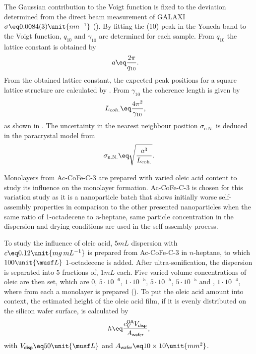 \documentclass[\main/dresen_thesis.tex]{subfiles}
\begin{document}
      The Gaussian contribution to the Voigt function is fixed to the deviation determined from the direct beam measurement of GALAXI $\sigma \eq 0.0084(3) \unit{nm^{-1}}$ ().
      By fitting the (10) peak in the Yoneda band to the Voigt function, $q_{10}$ and $\gamma_{10}$ are determined for each sample.
      From $q_{10}$ the lattice constant is obtained by
      \begin{align}
        a &\eq \frac{2 \pi}{q_{10}}.
      \end{align}
      From the obtained lattice constant, the expected peak positions for a square lattice structure are calculated by .
      From $\gamma_{10}$ the coherence length is given by
      \begin{align}
        L_{coh.} &\eq \frac{4 \pi^2}{\gamma_{10}},
      \end{align}
      as shown in .
      The uncertainty in the nearest neighbour position $\sigma_{\mathrm{n.N.}}$ is deduced in the paracrystal model from
      \begin{align}
        \sigma_{\mathrm{n.N.}} \eq \sqrt{\frac{a^3}{L_\mathrm{coh.}}}.
      \end{align}

      Monolayers from Ac-CoFe-C-3 are prepared with varied oleic acid content to study its influence on the monolayer formation.
      Ac-CoFe-C-3 is chosen for this variation study as it is a nanoparticle batch that shows initially worse self-assembly properties in comparison to the other presented nanoparticles when the same ratio of 1-octadecene to \textit{n}-heptane, same particle concentration in the dispersion and drying conditions are used in the self-assembly process.

      To study the influence of oleic acid, $5 \unit{mL}$ dispersion with $c \eq 0.12 \unit{mg \, mL^{-1}}$ is prepared from Ac-CoFe-C-3 in $\mathit{n}$-heptane, to which $100 \unit{\musf L}$ 1-octadecene is added.
      After ultra-sonification, the dispersion is separated into 5 fractions of, $1 \unit{mL}$ each.
      Five varied volume concentrations of oleic are then set, which are $0$, $5 \cdot 10^{-6}$, $1 \cdot 10^{-5}$, $5 \cdot 10^{-5}$, $5 \cdot 10^{-5}$ and , $1 \cdot 10^{-4}$, where from each a monolayer is prepared ().
      To put the oleic acid amount into context, the estimated height of the oleic acid film, if it is evenly distributed on the silicon wafer surface, is calculated by
      \begin{align}
        \label{eq:monolayers:preparation:solventVariation:OAAddend}
        h \eq \frac{c_V^\textsf{OA} V_\textsf{disp}}{A_\textsf{wafer}},
      \end{align}
      with $V_\textsf{disp} \eq 50 \unit{\musf L}$ and $A_\textsf{wafer} \eq 10 \times 10 \unit{mm^2}$.
\end{document}
